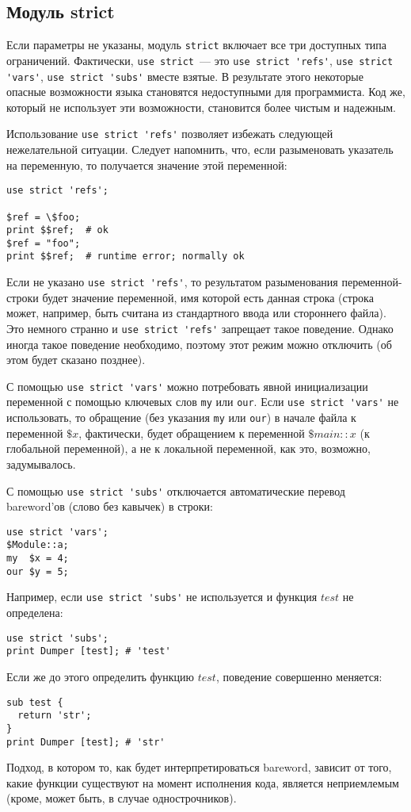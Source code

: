 \subsection{Модуль strict} %
Если параметры не указаны, модуль \verb|strict| включает все три доступных типа ограничений. Фактически, \verb|use strict|~--- это \verb|use strict 'refs'|, \verb|use strict 'vars'|, \verb|use strict 'subs'| вместе взятые. В результате этого некоторые опасные возможности языка становятся недоступными для программиста. Код же, который не использует эти возможности, становится более чистым и надежным.

Использование \verb|use strict 'refs'| позволяет избежать следующей нежелательной ситуации. Следует напомнить, что, если разыменовать указатель на переменную, то получается значение этой переменной:
\begin{verbatim}
use strict 'refs';

$ref = \$foo;
print $$ref;  # ok
$ref = "foo";
print $$ref;  # runtime error; normally ok
\end{verbatim}
Если не указано \verb|use strict 'refs'|, то результатом разыменования переменной-строки будет значение переменной, имя которой есть данная строка (строка может, например, быть считана из стандартного ввода или стороннего файла). Это немного странно и \verb|use strict 'refs'| запрещает такое поведение. Однако иногда такое поведение необходимо, поэтому этот режим можно отключить (об этом будет сказано позднее).

С помощью \verb|use strict 'vars'| можно потребовать явной инициализации переменной с помощью ключевых слов \verb|my| или \verb|our|. Если \verb|use strict 'vars'| не использовать, то обращение (без указания \verb|my| или \verb|our|) в начале файла к переменной $\$x$, фактически, будет обращением к переменной $\$main::x$ (к глобальной переменной), а не к локальной переменной, как это, возможно, задумывалось.

С помощью \verb|use strict 'subs'| отключается автоматические перевод bareword'ов (слово без кавычек) в строки:
\begin{verbatim}
use strict 'vars';
$Module::a;
my  $x = 4;
our $y = 5;
\end{verbatim}
Например, если \verb|use strict 'subs'| не используется и функция $test$ не определена:
\begin{verbatim}
use strict 'subs';
print Dumper [test]; # 'test'
\end{verbatim}
Если же до этого определить функцию $test$, поведение совершенно меняется:
\begin{verbatim}
sub test {
  return 'str';
}
print Dumper [test]; # 'str'
\end{verbatim}
Подход, в котором то, как будет интерпретироваться bareword, зависит от того, какие функции существуют на момент исполнения кода, является неприемлемым (кроме, может быть, в случае однострочников).

